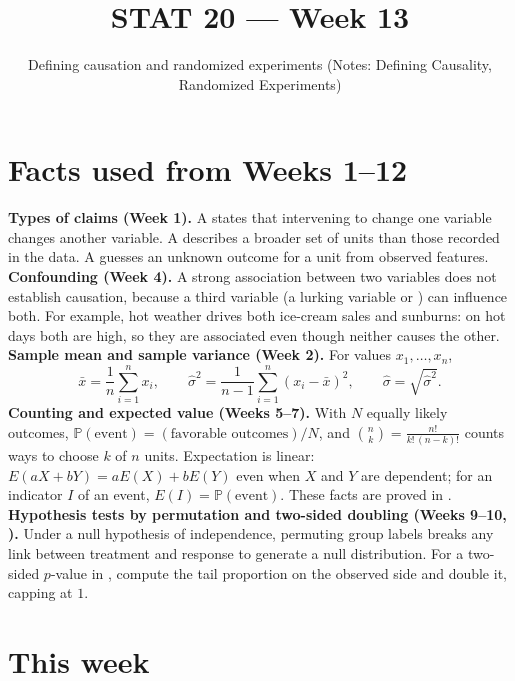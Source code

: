 \documentclass[10pt]{scrartcl}
\title{STAT 20 --- Week 13}
\subtitle{Defining causation and randomized experiments (Notes: Defining Causality, Randomized Experiments)}
\author{}\date{}\ihead{}
\begin{document}
\maketitle

\section{Facts used from Weeks 1--12}
\begin{enumerate}[label=(W\arabic*),leftmargin=2.8em,itemsep=4pt]
  \ii {}\textbf{Types of claims (Week 1).} A  states that intervening to change one variable changes another variable. A  describes a broader set of units than those recorded in the data. A  guesses an unknown outcome for a unit from observed features.
  \ii {}\textbf{Confounding (Week 4).} A strong association between two variables does not establish causation, because a third variable (a lurking variable or ) can influence both. For example, hot weather drives both ice-cream sales and sunburns: on hot days both are high, so they are associated even though neither causes the other.
  \ii {}\textbf{Sample mean and sample variance (Week 2).} For values $x_1,\dots,x_n$,
  \[
    \bar x = \frac{1}{n}\sum_{i=1}^n x_i, \qquad \hat\sigma^2 = \frac{1}{n-1}\sum_{i=1}^n (x_i - \bar x)^2, \qquad \hat\sigma = \sqrt{\hat\sigma^2}.
  \]
  \ii {}\textbf{Counting and expected value (Weeks 5--7).} With $N$ equally likely outcomes, $\mathbb P(\text{event}) = (\text{favorable outcomes})/N$, and $\binom{n}{k} = \frac{n!}{k!\,(n-k)!}$ counts ways to choose $k$ of $n$ units. Expectation is linear: $E(aX+bY) = aE(X)+bE(Y)$ even when $X$ and $Y$ are dependent; for an indicator $I$ of an event, $E(I) = \mathbb P(\text{event})$. These facts are proved in .
  \ii {}\textbf{Hypothesis tests by permutation and two-sided doubling (Weeks 9--10, ).} Under a null hypothesis of independence, permuting group labels breaks any link between treatment and response to generate a null distribution. For a two-sided $p$-value in , compute the tail proportion on the observed side and double it, capping at $1$.
\end{enumerate}

\section{This week}
\end{document}
